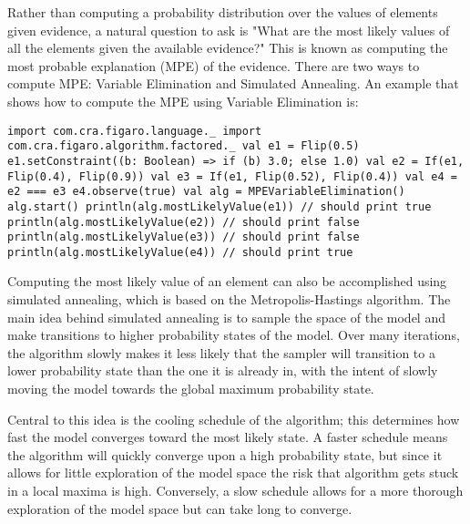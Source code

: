Rather than computing a probability distribution over the values of elements given evidence, a natural question to ask is "What are the most likely values of all the elements given the available evidence?" This is known as computing the most probable explanation (MPE) of the evidence. There are two ways to compute MPE: Variable Elimination and Simulated Annealing. An example that shows how to compute the MPE using Variable Elimination is:

\begin{flushleft}
\texttt{import com.cra.figaro.language.\_
\newline import com.cra.figaro.algorithm.factored.\_
\newline 
\newline val e1 = Flip(0.5)
\newline e1.setConstraint((b: Boolean) => if (b) 3.0; else 1.0)
\newline val e2 = If(e1, Flip(0.4), Flip(0.9)) 
\newline val e3 = If(e1, Flip(0.52), Flip(0.4)) 
\newline val e4 = e2 === e3
\newline e4.observe(true)
\newline 
\newline val alg = MPEVariableElimination()
\newline alg.start()
\newline println(alg.mostLikelyValue(e1)) // should print true 
\newline println(alg.mostLikelyValue(e2)) // should print false 
\newline println(alg.mostLikelyValue(e3)) // should print false 
\newline println(alg.mostLikelyValue(e4)) // should print true
}
\end{flushleft}

Computing the most likely value of an element can also be accomplished using simulated annealing, which is based on the Metropolis-Hastings algorithm. The main idea behind simulated annealing is to sample the space of the model and make transitions to higher probability states of the model. Over many iterations, the algorithm slowly makes it less likely that the sampler will transition to a lower probability state than the one it is already in, with the intent of slowly moving the model towards the global maximum probability state.

Central to this idea is the cooling schedule of the algorithm; this determines how fast the model converges toward the most likely state. A faster schedule means the algorithm will quickly converge upon a high probability state, but since it allows for little exploration of the model space the risk that algorithm gets stuck in a local maxima is high. Conversely, a slow schedule allows for a more thorough exploration of the model space but can take long to converge.


